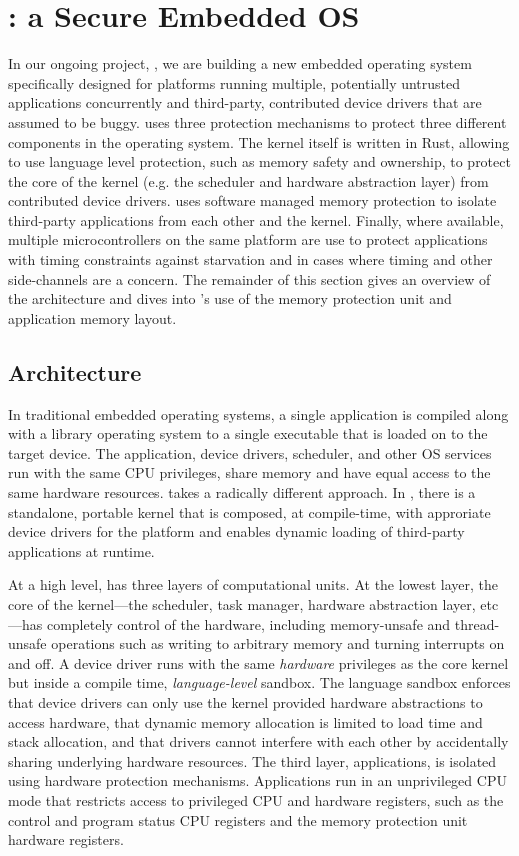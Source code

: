 \section{\name: a Secure Embedded OS}

In our ongoing project, \name, we are building a new embedded operating system
specifically designed for platforms running multiple, potentially untrusted
applications concurrently and third-party, contributed device drivers that are
assumed to be buggy. \name uses three protection mechanisms to protect three
different components in the operating system. The kernel itself is written in
Rust, allowing \name to use language level protection, such as memory safety and
ownership, to protect the core of the kernel (e.g. the scheduler and hardware
abstraction layer) from contributed device drivers. \name uses software managed
memory protection to isolate third-party applications from each other and the
kernel. Finally, where available, multiple microcontrollers on the same platform
are use to protect applications with timing constraints against starvation and
in cases where timing and other side-channels are a concern. The remainder of
this section gives an overview of the \name architecture and dives into \name's
use of the memory protection unit and application memory layout.

\subsection{Architecture}

In traditional embedded operating systems, a single application is
compiled along with a library operating system to a single executable that is
loaded on to the target device. The application, device drivers, scheduler, and
other OS services run with the same CPU privileges, share memory and have equal access
to the same hardware resources. \name takes a radically different approach. In
\name, there is a standalone, portable kernel that is composed, at compile-time,
with approriate device drivers for the platform and enables dynamic loading of
third-party applications at runtime.

At a high level, \name has three layers of computational units. At the lowest
layer, the core of the kernel---the scheduler, task manager, hardware
abstraction layer, etc---has completely control of the hardware, including
memory-unsafe and thread-unsafe operations such as writing to arbitrary memory
and turning interrupts on and off. A device driver runs with the same
\emph{hardware} privileges as the core kernel but inside a compile time,
\emph{language-level} sandbox. The language sandbox enforces that device drivers
can only use the kernel provided hardware abstractions to access hardware, that
dynamic memory allocation is limited to load time and stack allocation, and that
drivers cannot interfere with each other by accidentally sharing underlying
hardware resources. The third layer, applications, is isolated using hardware
protection mechanisms. Applications run in an unprivileged CPU mode that
restricts access to privileged CPU and hardware registers, such as the control
and program status CPU registers and the memory protection unit hardware
registers.

